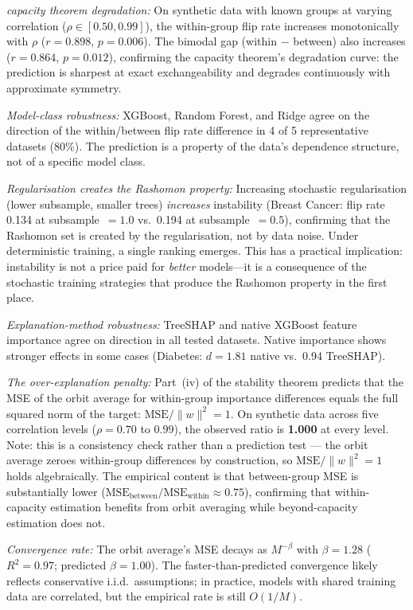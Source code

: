 \documentclass[11pt,a4paper]{article}
\begin{document}
\emph{capacity theorem degradation:} On synthetic data with known groups at varying correlation ($\rho \in [0.50, 0.99]$), the within-group flip rate increases monotonically with $\rho$ ($r = 0.898$, $p = 0.006$).  The bimodal gap (within $-$ between) also increases ($r = 0.864$, $p = 0.012$), confirming the capacity theorem's degradation curve: the prediction is sharpest at exact exchangeability and degrades continuously with approximate symmetry.

\emph{Model-class robustness:} XGBoost, Random Forest, and Ridge agree on the direction of the within/between flip rate difference in 4 of 5 representative datasets (80\%).  The prediction is a property of the data's dependence structure, not of a specific model class.

\emph{Regularisation creates the Rashomon property:} Increasing stochastic regularisation (lower subsample, smaller trees) \emph{increases} instability (Breast Cancer: flip rate 0.134 at subsample~$= 1.0$ vs.\ 0.194 at subsample~$= 0.5$), confirming that the Rashomon set is created by the regularisation, not by data noise.  Under deterministic training, a single ranking emerges.  This has a practical implication: instability is not a price paid for \emph{better} models---it is a consequence of the stochastic training strategies that produce the Rashomon property in the first place.

\emph{Explanation-method robustness:} TreeSHAP and native XGBoost feature importance agree on direction in all tested datasets.  Native importance shows stronger effects in some cases (Diabetes: $d = 1.81$ native vs.\ 0.94 TreeSHAP).

\emph{The over-explanation penalty:} Part~(iv) of the stability theorem predicts that the MSE of the orbit average for within-group importance differences equals the full squared norm of the target: $\text{MSE}/\|w\|^2 = 1$.  On synthetic data across five correlation levels ($\rho = 0.70$ to $0.99$), the observed ratio is \textbf{1.000} at every level.  Note: this is a consistency check rather than a prediction test --- the orbit average zeroes within-group differences by construction, so $\text{MSE}/\|w\|^2 = 1$ holds algebraically.  The empirical content is that between-group MSE is substantially lower ($\text{MSE}_{\text{between}} / \text{MSE}_{\text{within}} \approx 0.75$), confirming that within-capacity estimation benefits from orbit averaging while beyond-capacity estimation does not.

\emph{Convergence rate:} The orbit average's MSE decays as $M^{-\beta}$ with $\beta = 1.28$ ($R^2 = 0.97$; predicted $\beta = 1.00$).  The faster-than-predicted convergence likely reflects conservative i.i.d.\ assumptions; in practice, models with shared training data are correlated, but the empirical rate is still $O(1/M)$.
\end{document}

